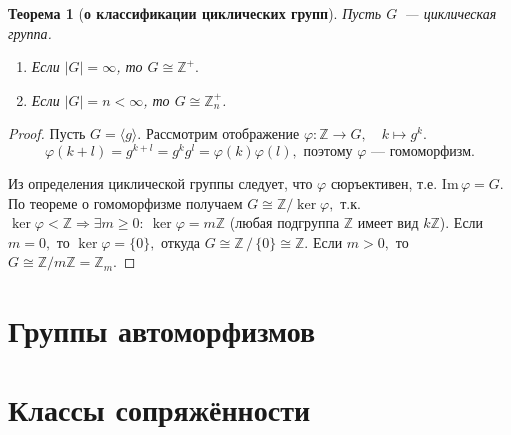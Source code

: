 \documentclass[a4paper, 14pt]{extarticle}
\newcommand{\n}{\par}
\newcommand{\integers}{\mathbb{Z}}
\newcommand{\suchthat}{{:}{ } \ }
\newcommand{\im}{\mathrm{Im} \,}
\renewcommand{\phi}{\varphi}
\theoremstyle{definition}
\theoremstyle{plain}
\newtheorem*{theorem*}{Теорема}
\numberwithin{theorem}{section}
\numberwithin{definition}{section}
\numberwithin{statement}{section}
\numberwithin{lemma}{section}
\numberwithin{consequence}{section}
\begin{document}
	\begin{theorem*}[\textbf{о классификации циклических групп}]
		Пусть $G$~--- циклическая группа.
		\begin{enumerate}
			\setlength\itemsep{0.1em}
			\item Если $|G| = \infty$, то $G \cong \integers ^ +.$
			\item Если $|G| = n < \infty$, то $G \cong \integers_n ^ +$.
		\end{enumerate}
	\end{theorem*}
	\begin{proof}
		Пусть ${G = \langle g \rangle.}$ Рассмотрим отображение $\phi: \integers \rightarrow G, \quad k \mapsto g^k.$
		\begin{equation*}
			\phi(k + l) = g^{k+l} = g^kg^l =
			\phi(k) \phi(l), \text{ поэтому } \phi \text{~--- гомоморфизм.}
		\end{equation*} \n
		Из определения циклической группы следует, что $\phi$ сюръективен, т.е. $\im \phi = G$. По теореме о гомоморфизме получаем ${G \cong \integers/\ker \phi,}$ т.к. ${\ker \phi < \integers \Longrightarrow \exists m \geqslant 0 \suchthat \ker \phi = m \integers}$ (любая подгруппа $\integers$ имеет вид $k\integers$). Если ${m = 0},$ то ${\ker \phi = \{0\},}$ откуда ${G \cong \integers \, / \, \{0\} \cong \integers.}$ Если ${m > 0,}$ то ${G \cong \integers/m\integers = \integers_m.}$
	\end{proof}
	\newpage
        \section{Группы автоморфизмов}
        \setcounter{definition}{0}
        \newpage
        \section{Классы сопряжённости}
        \setcounter{definition}{0}
	\newpage
\end{document}
